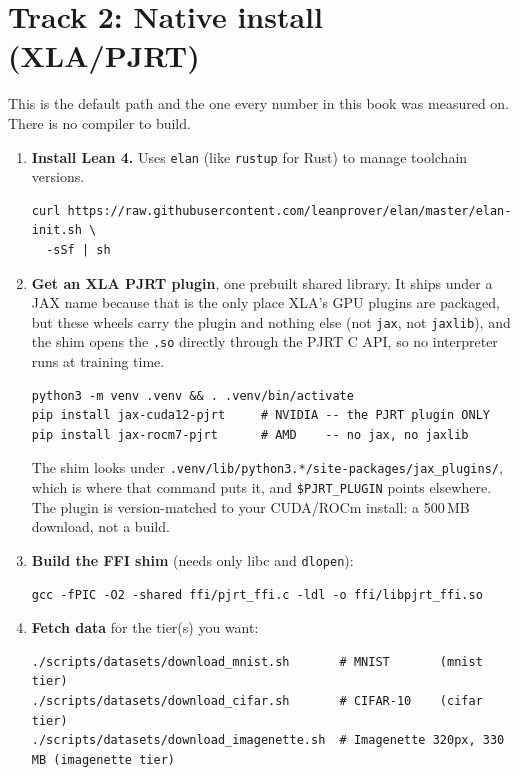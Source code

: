 \section*{Track 2: Native install (XLA/PJRT)}

This is the default path and the one every number in this book was measured
on. There is no compiler to build.

\begin{enumerate}
  \item \textbf{Install Lean 4.} Uses \texttt{elan} (like \texttt{rustup} for
    Rust) to manage toolchain versions.
\begin{verbatim}
curl https://raw.githubusercontent.com/leanprover/elan/master/elan-init.sh \
  -sSf | sh
\end{verbatim}

  \item \textbf{Get an XLA PJRT plugin}, one prebuilt shared library. It
    ships under a JAX name because that is the only place XLA's GPU plugins are
    packaged, but these wheels carry the plugin and nothing else (not
    \texttt{jax}, not \texttt{jaxlib}), and the shim opens the \texttt{.so}
    directly through the PJRT C API, so no interpreter runs at training time.
\begin{verbatim}
python3 -m venv .venv && . .venv/bin/activate
pip install jax-cuda12-pjrt     # NVIDIA -- the PJRT plugin ONLY
pip install jax-rocm7-pjrt      # AMD    -- no jax, no jaxlib
\end{verbatim}
    The shim looks under
    \texttt{.venv/lib/python3.*/site-packages/jax\_plugins/}, which is where
    that command puts it, and \texttt{\$PJRT\_PLUGIN} points elsewhere. The
    plugin is version-matched to your CUDA/ROCm install: a 500\,MB download,
    not a build.

  \item \textbf{Build the FFI shim} (needs only libc and \texttt{dlopen}):
\begin{verbatim}
gcc -fPIC -O2 -shared ffi/pjrt_ffi.c -ldl -o ffi/libpjrt_ffi.so
\end{verbatim}

  \item \textbf{Fetch data} for the tier(s) you want:
\begin{verbatim}
./scripts/datasets/download_mnist.sh       # MNIST       (mnist tier)
./scripts/datasets/download_cifar.sh       # CIFAR-10    (cifar tier)
./scripts/datasets/download_imagenette.sh  # Imagenette 320px, 330 MB (imagenette tier)
\end{verbatim}


\end{enumerate}
